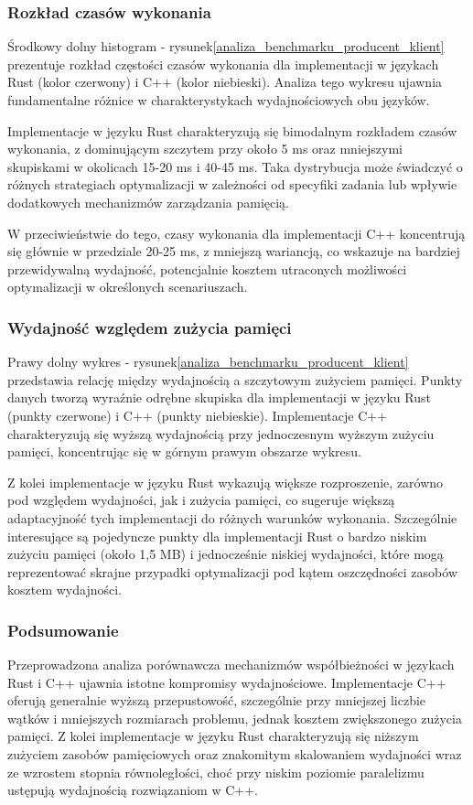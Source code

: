 \subsubsection{ Rozkład czasów wykonania}
Środkowy dolny histogram - rysunek\ref{analiza_benchmarku_producent_klient} prezentuje rozkład częstości czasów wykonania dla implementacji w językach Rust (kolor czerwony) i C++ (kolor niebieski). Analiza tego wykresu ujawnia fundamentalne różnice w charakterystykach wydajnościowych obu języków.

Implementacje w języku Rust charakteryzują się bimodalnym rozkładem czasów wykonania, z dominującym szczytem przy około 5 ms oraz mniejszymi skupiskami w okolicach 15-20 ms i 40-45 ms. Taka dystrybucja może świadczyć o różnych strategiach optymalizacji w zależności od specyfiki zadania lub wpływie dodatkowych mechanizmów zarządzania pamięcią.

W przeciwieństwie do tego, czasy wykonania dla implementacji C++ koncentrują się głównie w przedziale 20-25 ms, z mniejszą wariancją, co wskazuje na bardziej przewidywalną wydajność, potencjalnie kosztem utraconych możliwości optymalizacji w określonych scenariuszach.

\subsubsection{Wydajność względem zużycia pamięci}
Prawy dolny wykres - rysunek\ref{analiza_benchmarku_producent_klient} przedstawia relację między wydajnością a szczytowym zużyciem pamięci. Punkty danych tworzą wyraźnie odrębne skupiska dla implementacji w języku Rust (punkty czerwone) i C++ (punkty niebieskie). Implementacje C++ charakteryzują się wyższą wydajnością przy jednoczesnym wyższym zużyciu pamięci, koncentrując się w górnym prawym obszarze wykresu.

Z kolei implementacje w języku Rust wykazują większe rozproszenie, zarówno pod względem wydajności, jak i zużycia pamięci, co sugeruje większą adaptacyjność tych implementacji do różnych warunków wykonania. Szczególnie interesujące są pojedyncze punkty dla implementacji Rust o bardzo niskim zużyciu pamięci (około 1,5 MB) i jednocześnie niskiej wydajności, które mogą reprezentować skrajne przypadki optymalizacji pod kątem oszczędności zasobów kosztem wydajności.

\subsubsection{Podsumowanie}
Przeprowadzona analiza porównawcza mechanizmów współbieżności w językach Rust i C++ ujawnia istotne kompromisy wydajnościowe. Implementacje C++ oferują generalnie wyższą przepustowość, szczególnie przy mniejszej liczbie wątków i mniejszych rozmiarach problemu, jednak kosztem zwiększonego zużycia pamięci. Z kolei implementacje w języku Rust charakteryzują się niższym zużyciem zasobów pamięciowych oraz znakomitym skalowaniem wydajności wraz ze wzrostem stopnia równoległości, choć przy niskim poziomie paralelizmu ustępują wydajnością rozwiązaniom w C++.


